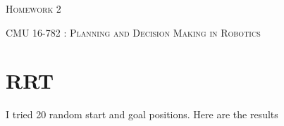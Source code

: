 \documentclass[12pt]{article}
\begin{document}
\begin{center}
  \centerline{\textsc{\LARGE  Homework 2}}
  \vspace{1em}
  \textsc{\large CMU 16-782 : Planning and Decision Making in Robotics} \\
\end{center}

\section{RRT}
I tried 20 random start and goal positions. Here are the results 
\end{document}
